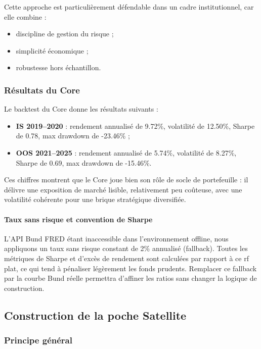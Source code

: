 \documentclass{article}
\begin{document}
Cette approche est particulièrement défendable dans un cadre institutionnel, car elle combine :
\begin{itemize}
    \item discipline de gestion du risque ;
    \item simplicité économique ;
    \item robustesse hors échantillon.
\end{itemize}

\subsubsection{Résultats du Core}

Le backtest du Core donne les résultats suivants :
\begin{itemize}
    \item \textbf{IS 2019--2020} : rendement annualisé de 9.72\%, volatilité de 12.50\%, Sharpe de 0.78, max drawdown de -23.46\% ;
    \item \textbf{OOS 2021--2025} : rendement annualisé de 5.74\%, volatilité de 8.27\%, Sharpe de 0.69, max drawdown de -15.46\%.
\end{itemize}

Ces chiffres montrent que le Core joue bien son rôle de socle de portefeuille : il délivre une exposition de marché lisible, relativement peu coûteuse, avec une volatilité cohérente pour une brique stratégique diversifiée.

\paragraph{Taux sans risque et convention de Sharpe}
L’API Bund FRED étant inaccessible dans l’environnement offline, nous appliquons un taux sans risque constant de 2\% annualisé (fallback). Toutes les métriques de Sharpe et d’excès de rendement sont calculées par rapport à ce rf plat, ce qui tend à pénaliser légèrement les fonds prudents. Remplacer ce fallback par la courbe Bund réelle permettra d’affiner les ratios sans changer la logique de construction.

\subsection{Construction de la poche Satellite}

\subsubsection{Principe général}
\end{document}
